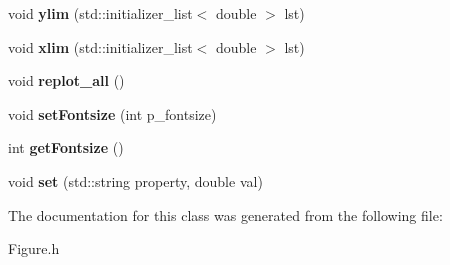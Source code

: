 \begin{DoxyCompactItemize}
\item 
\hypertarget{classkeycpp_1_1_figure_aa01c44e6509c7075f4f547531c39741b}{void {\bfseries ylim} (std\-::initializer\-\_\-list$<$ double $>$ lst)}\label{classkeycpp_1_1_figure_aa01c44e6509c7075f4f547531c39741b}

\item 
\hypertarget{classkeycpp_1_1_figure_ae779c53eebbee42148324bd8adfd7d01}{void {\bfseries xlim} (std\-::initializer\-\_\-list$<$ double $>$ lst)}\label{classkeycpp_1_1_figure_ae779c53eebbee42148324bd8adfd7d01}

\item 
\hypertarget{classkeycpp_1_1_figure_a47cae082612e5436a6b0bc3d7f27e9d9}{void {\bfseries replot\-\_\-all} ()}\label{classkeycpp_1_1_figure_a47cae082612e5436a6b0bc3d7f27e9d9}

\item 
\hypertarget{classkeycpp_1_1_figure_ab8d777d1b44e242b104350093ef09543}{void {\bfseries set\-Fontsize} (int p\-\_\-fontsize)}\label{classkeycpp_1_1_figure_ab8d777d1b44e242b104350093ef09543}

\item 
\hypertarget{classkeycpp_1_1_figure_a6c1e59c4e8288e3880bde70db3723037}{int {\bfseries get\-Fontsize} ()}\label{classkeycpp_1_1_figure_a6c1e59c4e8288e3880bde70db3723037}

\item 
\hypertarget{classkeycpp_1_1_figure_a7375fe8611759fda180d626f91eab510}{void {\bfseries set} (std\-::string property, double val)}\label{classkeycpp_1_1_figure_a7375fe8611759fda180d626f91eab510}

\end{DoxyCompactItemize}


The documentation for this class was generated from the following file\-:\begin{DoxyCompactItemize}
\item 
Figure.\-h\end{DoxyCompactItemize}
